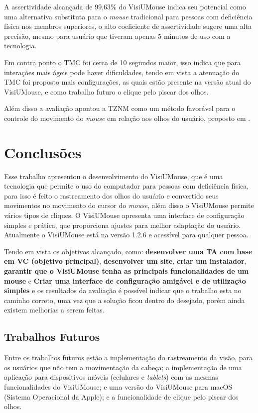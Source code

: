 A assertividade alcançada de 99,63\% do VisiUMouse indica seu potencial como uma alternativa substituta para o \textit{mouse} tradicional para pessoas com deficiência física nos membros superiores, o alto coeficiente de assertividade sugere uma alta precisão, mesmo para usuário que tiveram apenas 5 minutos de uso com a tecnologia.

Em contra ponto o TMC foi cerca de 10 segundos maior, isso indica que para interações mais ágeis pode haver dificuldades, tendo em vista a atenuação do TMC foi proposto mais configurações, as quais estão presente na versão atual do VisiUMouse, e como trabalho futuro o clique pelo piscar dos olhos.

Além disso a avaliação apontou a TZNM como um método favorável para o controle do movimento do \textit{mouse} em relação aos olhos do usuário, proposto em \cite{xavier2017visiumouse}.


\chapter{Conclusões}\label{CAP-consideracoes-finais-trabalhos-futuros}
Esse trabalho apresentou o desenvolvimento do VisiUMouse, que é uma tecnologia que permite o uso do computador para pessoas com deficiência física, para isso é feito o rastreamento dos olhos do usuário e convertido seus movimentos no movimento do cursor do \textit{mouse}, além disso o VisiUMouse permite vários tipos de cliques. O VisiUMouse apresenta uma interface de configuração simples e prática, que proporciona ajustes para melhor adaptação do usuário. Atualmente o VisiUMouse está na versão 1.2.6 e acessível para qualquer pessoa.

Tendo em vista os objetivos alcançado, como: \textbf{desenvolver uma TA com base em VC (objetivo principal)}, \textbf{desenvolver um site}, \textbf{criar um instalador}, \textbf{garantir que o VisiUMouse tenha as principais funcionalidades de um mouse} e \textbf{Criar uma interface de configuração amigável e de utilização simples} e os resultados da avaliação é possível indicar que o trabalho esta no caminho correto, uma vez que a solução ficou dentro do desejado, porém ainda existem melhorias a serem feitas.

\section{Trabalhos Futuros}

Entre os trabalhos futuros estão a implementação do rastreamento da visão, para os usuários que não tem a movimentação da cabeça; a implementação de uma aplicação para dispositivos móveis (celulares e \textit{tablets}) com as mesmas funcionalidades do VisiUMouse; e uma versão do VisiUMouse para macOS (Sistema Operacional da Apple); e a funcionalidade de clique pelo piscar dos olhos.

